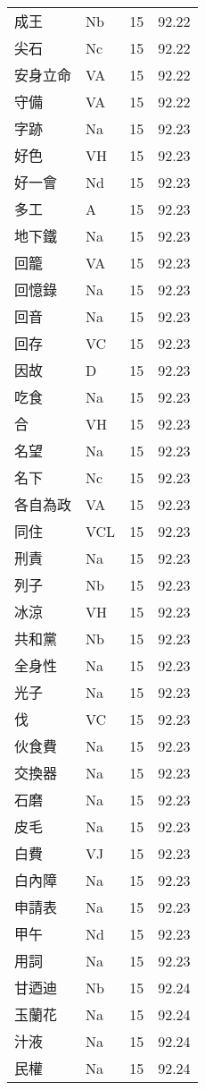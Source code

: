 \documentclass[twocolumn]{book}
\begin{document}
\begin{supertabular}{llrr}
成王 & Nb & 15 &  92.22\\
尖石 & Nc & 15 &  92.22\\
安身立命 & VA & 15 &  92.22\\
守備 & VA & 15 &  92.22\\
字跡 & Na & 15 &  92.23\\
好色 & VH & 15 &  92.23\\
好一會 & Nd & 15 &  92.23\\
多工 & A & 15 &  92.23\\
地下鐵 & Na & 15 &  92.23\\
回籠 & VA & 15 &  92.23\\
回憶錄 & Na & 15 &  92.23\\
回音 & Na & 15 &  92.23\\
回存 & VC & 15 &  92.23\\
因故 & D & 15 &  92.23\\
吃食 & Na & 15 &  92.23\\
合 & VH & 15 &  92.23\\
名望 & Na & 15 &  92.23\\
名下 & Nc & 15 &  92.23\\
各自為政 & VA & 15 &  92.23\\
同住 & VCL & 15 &  92.23\\
刑責 & Na & 15 &  92.23\\
列子 & Nb & 15 &  92.23\\
冰涼 & VH & 15 &  92.23\\
共和黨 & Nb & 15 &  92.23\\
全身性 & Na & 15 &  92.23\\
光子 & Na & 15 &  92.23\\
伐 & VC & 15 &  92.23\\
伙食費 & Na & 15 &  92.23\\
交換器 & Na & 15 &  92.23\\
石磨 & Na & 15 &  92.23\\
皮毛 & Na & 15 &  92.23\\
白費 & VJ & 15 &  92.23\\
白內障 & Na & 15 &  92.23\\
申請表 & Na & 15 &  92.23\\
甲午 & Nd & 15 &  92.23\\
用詞 & Na & 15 &  92.23\\
甘迺迪 & Nb & 15 &  92.24\\
玉蘭花 & Na & 15 &  92.24\\
汁液 & Na & 15 &  92.24\\
民權 & Na & 15 &  92.24\\

\end{supertabular}
\end{document}
